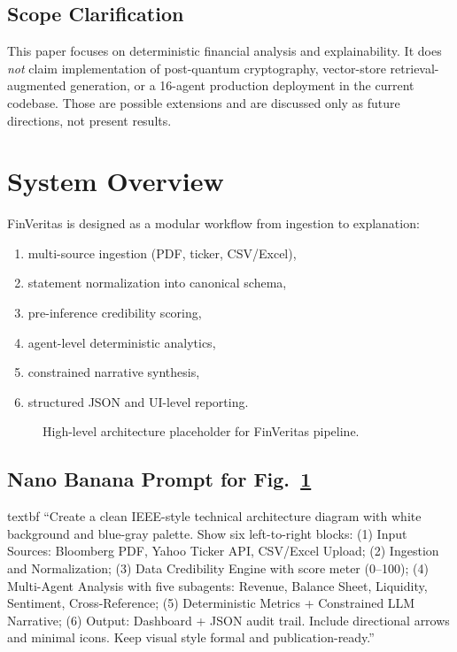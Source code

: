 \documentclass[conference]{IEEEtran}
\begin{document}
\subsection{Scope Clarification}
This paper focuses on deterministic financial analysis and explainability. It does \emph{not} claim implementation of post-quantum cryptography, vector-store retrieval-augmented generation, or a 16-agent production deployment in the current codebase. Those are possible extensions and are discussed only as future directions, not present results.

\section{System Overview}
FinVeritas is designed as a modular workflow from ingestion to explanation:
\begin{enumerate}
    \item multi-source ingestion (PDF, ticker, CSV/Excel),
    \item statement normalization into canonical schema,
    \item pre-inference credibility scoring,
    \item agent-level deterministic analytics,
    \item constrained narrative synthesis,
    \item structured JSON and UI-level reporting.
\end{enumerate}

\begin{figure}[t]
\centering
{}
\caption{High-level architecture placeholder for FinVeritas pipeline.}
\label{fig:sys_arch_placeholder}
\end{figure}

\subsection{Nano Banana Prompt for Fig.~\ref{fig:sys_arch_placeholder}}
\csname textbf ``Create a clean IEEE-style technical architecture diagram with white background and blue-gray palette. Show six left-to-right blocks: (1) Input Sources: Bloomberg PDF, Yahoo Ticker API, CSV/Excel Upload; (2) Ingestion and Normalization; (3) Data Credibility Engine with score meter (0--100); (4) Multi-Agent Analysis with five subagents: Revenue, Balance Sheet, Liquidity, Sentiment, Cross-Reference; (5) Deterministic Metrics + Constrained LLM Narrative; (6) Output: Dashboard + JSON audit trail. Include directional arrows and minimal icons. Keep visual style formal and publication-ready.''
\end{document}

